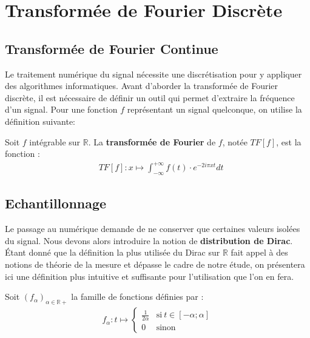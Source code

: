 \section{Transformée de Fourier Discrète}

\subsection{Transformée de Fourier Continue}

    Le traitement numérique du signal nécessite une discrétisation pour y appliquer des algorithmes informatiques. Avant d'aborder la transformée de Fourier discrète, il est nécessaire de définir un outil qui permet d'extraire la fréquence d'un signal. Pour une fonction $f$ représentant un signal quelconque, on utilise la définition suivante:


    Soit $f$ intégrable sur $\mathbb{R}$. La \textbf{transformée de Fourier} de $f$, notée $TF[f]$, est la fonction :
    \begin{align*}
        &TF[f] : x \mapsto \int_{-\infty}^{+\infty} f(t) \cdot e^{-2 i \pi x t}dt
    \end{align*}



\subsection{Echantillonnage}

Le passage au numérique demande de ne conserver que certaines valeurs isolées du signal. Nous devons alors introduire la notion de \textbf{distribution de Dirac}. Étant donné que la définition la plus utilisée du Dirac sur $\mathbb{R}$ fait appel à des notions de théorie de la mesure et dépasse le cadre de notre étude, on présentera ici une définition plus intuitive et suffisante pour l'utilisation que l'on en fera.

Soit $(f_\alpha)_{\alpha \in \mathbb{\mathbb{R}+}}$ la famille de fonctions définies par :
\begin{align*}
    f_\alpha : t \mapsto \left\{ \begin{array}{cl} \frac{1}{2\alpha} & \text{si} \ t \in [-\alpha;\alpha] \\ 0 &  \text{sinon}
\end{array} \right.
\end{align*}

